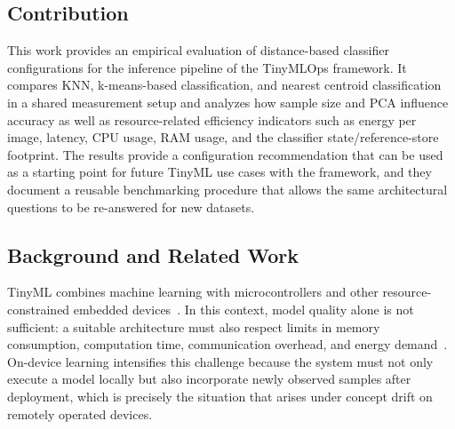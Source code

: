 \documentclass[sigconf,review,nonacm]{acmart}
\begin{document}
\subsection{Contribution}
This work provides an empirical evaluation of distance-based classifier configurations for the inference pipeline of the TinyMLOps framework.
It compares KNN, k-means-based classification, and nearest centroid classification in a shared measurement setup and analyzes how sample size and PCA influence accuracy as well as resource-related efficiency indicators such as energy per image, latency, CPU usage, RAM usage, and the classifier state/reference-store footprint.
The results provide a configuration recommendation that can be used as a starting point for future TinyML use cases with the framework, and they document a reusable benchmarking procedure that allows the same architectural questions to be re-answered for new datasets.

\subsection{Background and Related Work}
TinyML combines machine learning with microcontrollers and other resource-constrained embedded devices~\cite{disabato2020incremental}.
In this context, model quality alone is not sufficient: a suitable architecture must also respect limits in memory consumption, computation time, communication overhead, and energy demand~\cite{disabato2020incremental}.
On-device learning intensifies this challenge because the system must not only execute a model locally but also incorporate newly observed samples after deployment, which is precisely the situation that arises under concept drift on remotely operated devices.
\end{document}
